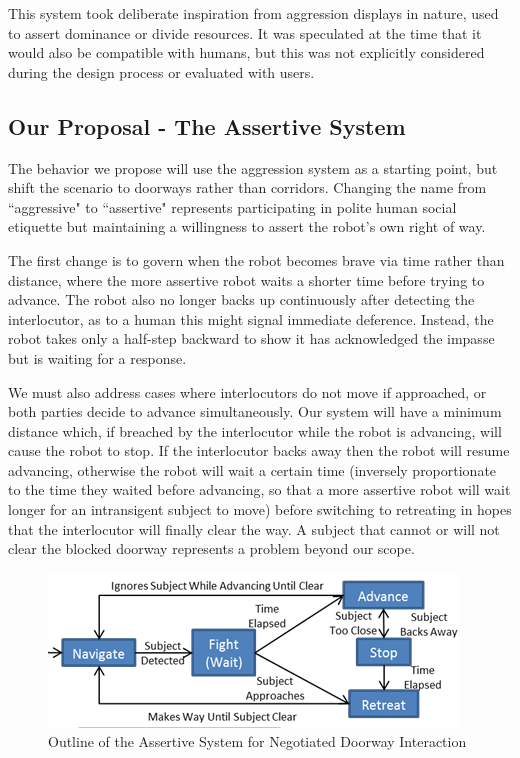 \documentclass[letterpaper, 10 pt, conference]{ieeeconf}  %
\begin{document}
This system took deliberate inspiration from aggression displays in nature, used to assert dominance or divide resources. It was speculated at the time that it would also be compatible with humans, but this was not explicitly considered during the design process or evaluated with users. 


\subsection{Our Proposal - The Assertive System}

The behavior we propose will use the aggression system as a starting point, but shift the scenario to doorways rather than corridors. Changing the name from ``aggressive" to ``assertive" represents participating in polite human social etiquette but maintaining a willingness to assert the robot’s own right of way.

The first change is to govern when the robot becomes brave via time rather than distance, where the more assertive robot waits a shorter time before trying to advance. The robot also no longer backs up continuously after detecting the interlocutor, as to a human this might signal immediate deference. Instead, the robot takes only a half-step backward to show it has acknowledged the impasse but is waiting for a response. 

We must also address cases where interlocutors do not move if approached, or both parties decide to advance simultaneously. Our system will have a minimum distance which, if breached by the interlocutor while the robot is advancing, will cause the robot to stop. If the interlocutor backs away then the robot will resume advancing, otherwise the robot will wait a certain time (inversely proportionate to the time they waited before advancing, so that a more assertive robot will wait longer for an intransigent subject to move) before switching to retreating in hopes that the interlocutor will finally clear the way. A subject that cannot or will not clear the blocked doorway represents a problem beyond our scope. 
 
    \begin{figure}
      \centering
      \includegraphics{assertive_behavior.png}
      \caption{Outline of the Assertive System for Negotiated Doorway Interaction}
      \label{fig:Assertive}
   \end{figure}
 
\end{document}
